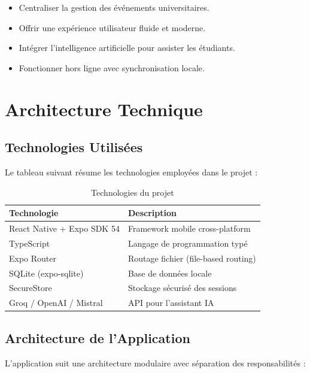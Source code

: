 \documentclass[12pt,a4paper]{article}
\begin{document}
\begin{itemize}
    \item Centraliser la gestion des événements universitaires.
    \item Offrir une expérience utilisateur fluide et moderne.
    \item Intégrer l'intelligence artificielle pour assister les étudiants.
    \item Fonctionner hors ligne avec synchronisation locale.
\end{itemize}

\section{Architecture Technique}

\subsection{Technologies Utilisées}

Le tableau suivant résume les technologies employées dans le projet :

\begin{table}[H]
    \centering
    \begin{tabularx}{\textwidth}{|l|X|}
        \hline
        \textbf{Technologie} & \textbf{Description} \\
        \hline
        React Native + Expo SDK 54 & Framework mobile cross-platform \\
        TypeScript & Langage de programmation typé \\
        Expo Router & Routage fichier (file-based routing) \\
        SQLite (expo-sqlite) & Base de données locale \\
        SecureStore & Stockage sécurisé des sessions \\
        Groq / OpenAI / Mistral & API pour l'assistant IA \\
        \hline
    \end{tabularx}
    \caption{Technologies du projet}
\end{table}

\subsection{Architecture de l'Application}

L'application suit une architecture modulaire avec séparation des responsabilités :
\end{document}
